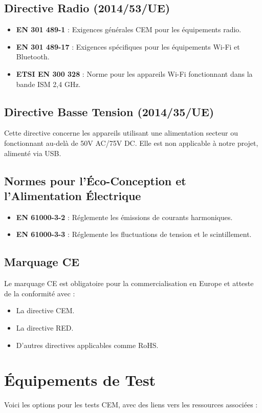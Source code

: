 \documentclass[a4paper,12pt]{article}
\begin{document}
\subsection{Directive Radio (2014/53/UE)}
\begin{itemize}
    \item \textbf{EN 301 489-1} : Exigences générales CEM pour les équipements radio.
    \item \textbf{EN 301 489-17} : Exigences spécifiques pour les équipements Wi-Fi et Bluetooth.
    \item \textbf{ETSI EN 300 328} : Norme pour les appareils Wi-Fi fonctionnant dans la bande ISM 2,4 GHz.
\end{itemize}

\subsection{Directive Basse Tension (2014/35/UE)}
Cette directive concerne les appareils utilisant une alimentation secteur ou fonctionnant au-delà de 50V AC/75V DC. Elle est non applicable à notre projet, alimenté via USB.

\subsection{Normes pour l’Éco-Conception et l’Alimentation Électrique}
\begin{itemize}
    \item \textbf{EN 61000-3-2} : Réglemente les émissions de courants harmoniques.
    \item \textbf{EN 61000-3-3} : Réglemente les fluctuations de tension et le scintillement.
\end{itemize}

\subsection{Marquage CE}
Le marquage CE est obligatoire pour la commercialisation en Europe et atteste de la conformité avec :
\begin{itemize}
    \item La directive CEM.
    \item La directive RED.
    \item D'autres directives applicables comme RoHS.
\end{itemize}

\newpage

\section{Équipements de Test}
Voici les options pour les tests CEM, avec des liens vers les ressources associées :
\end{document}
